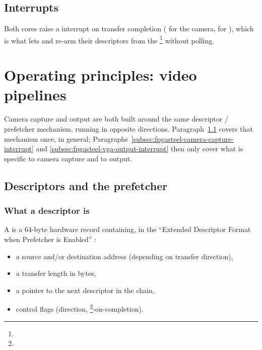 \subsection{Interrupts}
\label{subsec:fpgasteel-simple-forwarding-interrupts}

Both  cores raise a  interrupt on transfer completion ( for the camera,  for ), which is what lets  and  re-arm their descriptors from the \footnote{} without polling.

\section{Operating principles:  video pipelines}
\label{sec:fpgasteel-msgdma-video-pipelines}

Camera capture and  output are both built around the same descriptor / prefetcher mechanism, running in opposite directions. Paragraph~\ref{subsec:fpgasteel-descriptors-prefetcher} covers that mechanism once, in general; Paragraphs~\ref{subsec:fpgasteel-camera-capture-interrupt} and \ref{subsec:fpgasteel-vga-output-interrupt} then only cover what is specific to camera capture and to  output.

\subsection{Descriptors and the prefetcher}
\label{subsec:fpgasteel-descriptors-prefetcher}

\subsubsection{What a descriptor is}

A  is a 64-byte hardware record containing, in the ``Extended Descriptor Format when Prefetcher is Enabled'' \cite[Table 305, p.~379]{EP-IPUG}: 

\begin{itemize}
    \item a source and/or destination  address (depending on transfer direction),
    \item a transfer length in bytes,
    \item a pointer to the next descriptor in the chain,
    \item control flags (direction, \footnote{}-on-completion).
\end{itemize}


